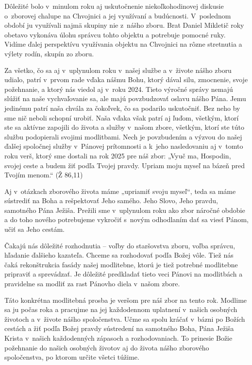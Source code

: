 Dôležité bolo v~minulom roku aj uskutočnenie niekoľkohodinovej diskusie o~zborovej chalupe na Chvojnici a jej využívaní a budúcnosti. V~poslednom období ju využívali najmä skupiny nie z~nášho zboru. Brat Daniel Mikletič roky obetavo vykonáva úlohu správcu tohto objektu a potrebuje pomocné ruky. Vidíme ďalej perspektívu využívania objektu na Chvojnici na rôzne stretnutia a výlety rodín, skupín zo zboru.


Za všetko, čo sa aj v~uplynulom roku v~našej službe a v~živote nášho zboru udialo, patrí v~prvom rade vďaka nášmu Bohu, ktorý dával silu, zmocnenie, svoje požehnanie, a ktorý nás viedol aj v~roku 2024. Tieto výročné správy nemajú slúžiť na naše vychvaľovanie sa, ale majú povzbudzovať oslavu nášho Pána. Jemu jedinému patrí naša chvála za čokoľvek, čo sa podarilo uskutočniť. Bez neho by sme nič neboli schopní urobiť. Naša vďaka však patrí aj ľuďom, všetkým, ktorí ste sa aktívne zapojili do života a služby v~našom zbore, všetkým, ktorí ste túto službu podopierali svojimi modlitbami. Nech je povzbudením a výzvou do našej ďalšej spoločnej služby v~Pánovej prítomnosti a k~jeho nasledovaniu aj v~tomto roku verš, ktorý sme dostali na rok 2025 pre náš zbor: „Vyuč ma, Hospodin, svojej ceste a budem žiť podľa Tvojej pravdy. Upriam moju myseľ na bázeň pred Tvojím menom.“ (Ž 86,11)

Aj v~otázkach zborového života máme „upriamiť svoju myseľ“, teda sa máme sústrediť na Boha a rešpektovať Jeho samého. Jeho Slovo, Jeho pravdu, samotného Pána Ježiša. Prežili sme v~uplynulom roku ako zbor náročné obdobie a do toho nového potrebujeme vykročiť s~novým odhodlaním dať sa viesť Pánom, učiť sa Jeho cestám.

Čakajú nás dôležité rozhodnutia -- voľby do staršovstva zboru, voľba správcu, hľadanie ďalšieho kazateľa. Chceme sa rozhodovať podľa Božej vôle. Tiež nás čaká rekonštrukcia fasády našej modlitebne, ktorú je tiež potrebné modlitebne pripraviť a sprevádzať. Je dôležité predkladať tieto veci Pánovi na modlitbách a pravidelne sa modliť za rast Pánovho diela v~našom zbore.

Táto konkrétna modlitebná prosba je veršom pre náš zbor na tento rok. Modlime sa ju počas roka a pracujme na jej každodennom uplatnení v~našich osobných životoch a v~živote nášho spoločenstva. Učme sa spolu kráčať v~bázni po Božích cestách a žiť podľa Božej pravdy sústredení na samotného Boha, Pána Ježiša Krista v~našich každodenných zápasoch a rozhodovaniach. To prinesie Božie požehnanie do našich osobných životov aj do života nášho zborového spoločenstva, po ktorom určite všetci túžime.

